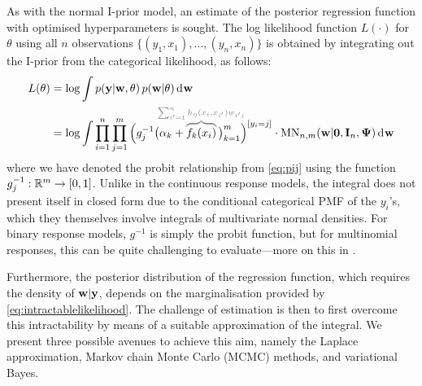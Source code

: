 
As with the normal I-prior model, an estimate of the posterior regression function with optimised hyperparameters is sought.
The log likelihood function $L(\cdot)$ for $\theta$ using all $n$ observations $\{(y_1,x_1),\dots,(y_n,x_n)\}$ is obtained by integrating out the I-prior from the categorical likelihood, as follows:
\begin{align}
  L(\theta) 
  &= \log \int p(\by | \bw, \theta) \, p(\bw|\theta) \dint \bw \nonumber \\
  &= \log \int \prod_{i=1}^n \prod_{j=1}^m \Big( g_j^{-1}\big(\alpha_k + 
  \greyoverbrace{f_k(x_i)}{\hidewidth\sum_{i'=1}^n h_\eta(x_i,x_{i'})w_{i'j}\hidewidth}
  \,\big)_{k=1}^m \Big)^{[y_i=j]} \cdot \MN_{n,m}(\bw|\bzero,\bI_n, \bPsi) \dint \bw \label{eq:intractablelikelihood}
\end{align}
where we have denoted the probit relationship from \cref{eq:pij} using the function $g_j^{-1}:\mathbb{R}^m \to [0,1]$.
Unlike in the continuous response models, the integral does not present itself in closed form due to the conditional categorical PMF of the $y_i$'s, which they themselves involve integrals of multivariate normal densities.
For binary response models, $g^{-1}$ is simply the probit function, but for multinomial responses, this can be quite challenging to evaluate---more on this in .

Furthermore, the posterior distribution of the regression function, which requires the density of ${\mathbf w}|{\mathbf y}$, depends on the marginalisation provided by \cref{eq:intractablelikelihood}.
The challenge of estimation is then to first overcome this intractability by means of a suitable approximation of the integral.
We present three possible avenues to achieve this aim, namely the Laplace approximation, Markov chain Monte Carlo (MCMC) methods, and  variational Bayes.


